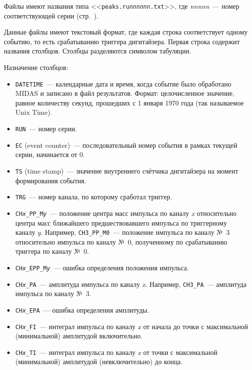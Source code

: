 \documentclass[12pt, a4paper, oneside, onecolumn]{book}
\newcommand{\MIDAS}{\mbox{MIDAS}}
\newcommand{\FILE}[1]{<<{\tt #1}>>}
\begin{document}
\newcommand{\COLUMN}[1]{{\tt #1}}

Файлы имеют названия типа \FILE{peaks.run{\it nnnnn}.txt}, где {\it nnnnn}~--- номер соответствующей серии (стр.~\pageref{sec-midas-run}).

Данные файлы имеют текстовый формат, где каждая строка соответствует одному событию, то есть срабатыванию триггера дигитайзера. Первая строка содержит названия столбцов. Столбцы разделяются символом табуляции.

Назначение столбцов:

\begin{itemize}

\item \COLUMN{DATETIME}~--- календарные дата и время, когда событие было обработано \MIDAS{} и записано в файл результатов. Формат: целочисленное значение, равное количеству секунд, прошедших с 1 января 1970 года (так называемое Unix Time).

\item \COLUMN{RUN}~--- номер серии.

\item \COLUMN{EC} (event counter)~--- последовательный номер события в рамках текущей серии, начинается от 0.

\item \COLUMN{TS} (time stamp)~--- значение внутреннего счётчика дигитайзера на момент формирования события.

\item \COLUMN{TRG}~--- номер канала, по которому сработал триггер.

\item \COLUMN{CH{\it x}\_PP\_M{\it y}}~--- положение центра масс импульса по каналу {\it x} относительно центра масс ближайшего предшествовавшего импульса по триггерному каналу {\it y}. Например, \COLUMN{CH3\_PP\_M0}~--- положение импульса по каналу №~3 относительно импульса по каналу №~0, полученному по срабатыванию триггера по каналу №~0.

\item \COLUMN{CH{\it x}\_EPP\_M{\it y}}~--- ошибка определения положения импульса.

\item \COLUMN{CH{\it x}\_PA}~--- амплитуда импульса по каналу {\it x}. Например, \COLUMN{CH3\_PA}~--- амплитуда импульса по каналу №~3.

\item \COLUMN{CH{\it x}\_EPA}~--- ошибка определения амплитуды.

\item \COLUMN{CH{\it x}\_FI}~--- интеграл импульса по каналу {\it x} от начала до точки с максимальной (минимальной) амплитудой включительно.

\item \COLUMN{CH{\it x}\_TI}~--- интеграл импульса по каналу {\it x} от точки с максимальной (минимальной) амплитудой (невключительно) до конца.

\end{itemize}


\printbibliography
\end{document}
